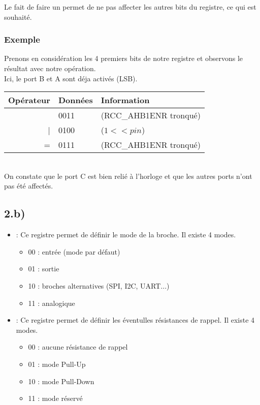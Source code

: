 {Le fait de faire un  permet de ne pas affecter les autres bits du registre, ce qui est souhaité. 

\subsubsection{Exemple}
Prenons en considération les 4 premiers bits de notre registre  et observons le résultat avec notre opération.\\
Ici, le port B et A sont déja activés (LSB).\\

\begin{tabular}{rl|l}
  Opérateur & Données & Information \\
\hline
    & 0011 & (RCC\_AHB1ENR tronqué)\\
   | & 0100 & ($1 << pin$)\\
   \hline
   = & 0111 & (RCC\_AHB1ENR tronqué)\\
  
\end{tabular} \\

On constate que le port C est bien relié à l'horloge et que les autres ports n'ont pas été affectés.

\subsection{2.b)}

\begin{itemize}

\item {} : Ce registre permet de définir le mode de la broche. Il existe 4 modes.

  \begin{itemize}
    \item 00 : entrée  (mode par défaut)
    \item 01 : sortie
    \item 10 : broches alternatives (SPI, I2C, UART...)
    \item 11 : analogique
  \end{itemize}

 \item {} : Ce registre permet de définir les éventulles résistances de rappel. Il existe 4 modes.

  \begin{itemize}
    \item 00 : aucune résistance de rappel
    \item 01 : mode Pull-Up
    \item 10 : mode Pull-Down
    \item 11 : mode réservé
  \end{itemize}


\end{itemize}}

